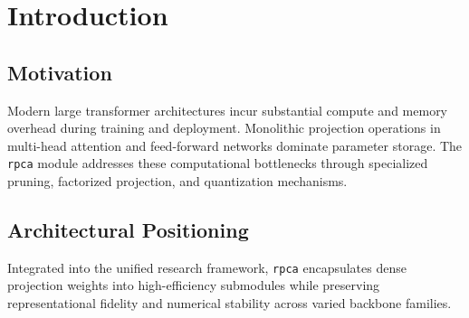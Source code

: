 \section{Introduction}

\subsection{Motivation}
Modern large transformer architectures incur substantial compute and memory overhead during training and deployment. Monolithic projection operations in multi-head attention and feed-forward networks dominate parameter storage. The \texttt{rpca} module addresses these computational bottlenecks through specialized pruning, factorized projection, and quantization mechanisms.

\subsection{Architectural Positioning}
Integrated into the unified research framework, \texttt{rpca} encapsulates dense projection weights into high-efficiency submodules while preserving representational fidelity and numerical stability across varied backbone families.
